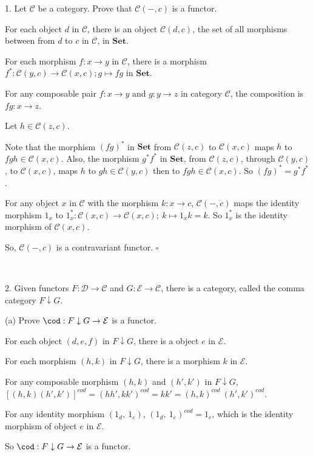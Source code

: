 \documentclass{article}
\begin{document}
1. Let $\mathcal{C}$ be a category. Prove that $\mathcal{C}(-,c)$ is a functor.

For each object $d$ in $\mathcal{C}$, there is an object $\mathcal{C}(d,c)$, the set of all morphisms between from $d$ to $c$ in $\mathcal{C}$, in $\mathbf{Set}$. 

For each morphism $f: x \to y$ in $\mathcal{C}$, there is a morphism \\$f^*: \mathcal{C}(y,c) \to \mathcal{C}(x,c); g \mapsto fg$ in $\mathbf{Set}$.

For any composable pair $f: x \to y$ and $g: y \to z$ in category $\mathcal{C}$, the composition is $fg: x \to z$. 

Let $h \in \mathcal{C}(z,c)$. 

Note that the morphism $(fg)^*$ in $\mathbf{Set}$ from $\mathcal{C}(z,c)$ to $\mathcal{C}(x,c)$ maps $h$ to $fgh \in \mathcal{C}(x,c)$. Also, the morphism $g^*f^*$ in $\mathbf{Set}$, from $\mathcal{C}(z,c)$, through $\mathcal{C}(y,c)$, to $\mathcal{C}(x,c)$, maps $h$ to $gh \in \mathcal{C}(y,c)$ then to $fgh \in \mathcal{C}(x,c)$. So $(fg)^* = g^*f^*$.

For any object $x$ in $\mathcal{C}$ with the morphism $k: x \to c$, $\mathcal{C}(-,c)$ maps the identity morphism $1_x$ to $1_x^*: \mathcal{C}(x,c) \to \mathcal{C}(x,c);~ k \mapsto 1_xk = k$. So $1_x^*$ is the identity morphism of $\mathcal{C}(x,c)$.

So, $\mathcal{C}(-,c)$ is a contravariant functor. $\square$

~

2. Given functors $F: \mathcal{D}\to\mathcal{C}$ and $G: \mathcal{E}\to\mathcal{C}$, there is a category, called the comma category $F\downarrow G$. 

(a) Prove $\cod: F\downarrow G \to \mathcal{E}$ is a functor.

For each object $(d,e,f)$ in $F\downarrow G$, there is a object $e$ in $\mathcal{E}$.

For each morphism $(h,k)$ in $F\downarrow G$, there is a morphism $k$ in $\mathcal{E}$.

For any composable morphism $(h,k)$ and $(h', k')$ in $F\downarrow G$, \\$[(h,k)(h',k')]^{cod} = (hh', kk')^{cod} = kk' = (h,k)^{cod}~(h',k')^{cod}$.

For any identity morphism $(1_d, ~1_e)$, $(1_d, ~1_e)^{cod} = 1_e$, which is the identity morphism of object $e$ in $\mathcal{E}$.

So $\cod: F\downarrow G \to \mathcal{E}$ is a functor.
\end{document}
